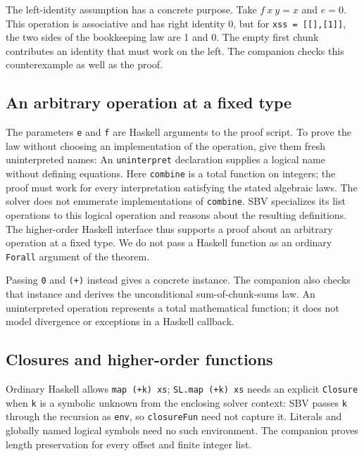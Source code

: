 \documentclass[review]{jfp-epi}
\newcommand{\code}[1]{\texttt{#1}}
\begin{document}
The left-identity assumption has a concrete purpose. Take $f\ x\ y=x$ and
$e=0$. This operation is associative and has right identity 0, but for
\code{xss = [[],[1]]}, the two sides of the bookkeeping law are 1 and 0.
The empty first chunk contributes an identity that must work on the left.
The companion checks this counterexample as well as the proof.

\subsection{An arbitrary operation at a fixed type}

The parameters \code{e} and \code{f} are Haskell arguments to the proof script.
To prove the law without choosing an implementation of the operation, give
them fresh uninterpreted names:
An \code{uninterpret} declaration supplies a logical name without defining
equations. Here \code{combine} is a total function on integers; the proof must
work for every interpretation satisfying the stated algebraic laws. The solver
does not enumerate implementations of \code{combine}. SBV specializes its list
operations to this logical operation and reasons about the resulting
definitions. The higher-order Haskell interface thus supports a proof about an
arbitrary operation at a fixed type. We do not pass a Haskell function as an
ordinary \code{Forall} argument of the theorem.

Passing \code{0} and \code{(+)} instead gives a concrete instance. The companion
also checks that instance and derives the unconditional sum-of-chunk-sums law.
An uninterpreted operation represents a total mathematical function; it does
not model divergence or exceptions in a Haskell callback.

\subsection{Closures and higher-order functions}
\label{sec:closures}

Ordinary Haskell allows \code{map (+k) xs}; \code{SL.map (+k) xs} needs an
explicit \code{Closure} when \code{k} is a symbolic unknown from the enclosing
solver context:
SBV passes \code{k} through the recursion as \code{env}, so \code{closureFun}
need not capture it. Literals and globally named logical symbols need no such
environment. The companion proves length preservation for every offset and
finite integer list.

\end{document}

